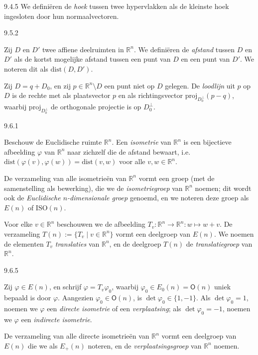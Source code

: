 \begin{res}{9.4.5}
We defini\"eren de \textit{hoek} tussen twee hypervlakken als de kleinste hoek ingesloten door hun normaalvectoren.
\end{res}

\begin{res}{9.5.2}
\begin{myenum}
\item Zij $D$ en $D'$ twee affiene deelruimten in $\mathbb R^n$. We defini\"eren de \textit{afstand} tussen $D$ en $D'$ als de kortst mogelijke afstand tussen een punt van $D$ en een punt van $D'$. We noteren dit als $\mathrm{dist}(D,D')$.
\item Zij $D=q+D_0$, en zij $p\in\mathbb R^n\setminus D$ een punt niet op $D$ gelegen. De \textit{loodlijn} uit $p$ op $D$ is de rechte met als plaatsvector $p$ en als richtingsvector $\mathrm{proj}_{D_0^\perp}(p-q)$, waarbij $\mathrm{proj}_{D_0^\perp}$ de orthogonale projectie is op $D_0^\perp$.
\end{myenum}
\end{res}

\begin{res}{9.6.1}
\begin{myenum}
\item Beschouw de Euclidische ruimte $\mathbb R^n$. Een \textit{isometrie} van $\mathbb R^n$ is een bijectieve afbeelding $\varphi$ van $\mathbb R^n$ naar zichzelf die de afstand bewaart, i.e.\ $\mathrm{dist}(\varphi(v),\varphi(w))=\mathrm{dist}(v,w)$ voor alle $v,w\in\mathbb R^n$.
\item De verzameling van alle isometrie\"en van $\mathbb R^n$ vormt een groep (met de samenstelling als bewerking), die we de \textit{isometriegroep} van $\mathbb R^n$ noemen; dit wordt ook de \textit{Euclidische $n$-dimensionale groep} genoemd, en we noteren deze groep als $E(n)$ of $\mathrm{ISO}(n)$.
\item Voor elke $v\in\mathbb R^n$ beschouwen we de afbeelding $T_v:\mathbb R^n\to\mathbb R^n:w\mapsto w+v$. De verzameling $T(n):=\{T_v\mid v\in\mathbb R^n\}$ vormt een deelgroep van $E(n)$. We noemen de elementen $T_v$ \textit{translaties} van $\mathbb R^n$, en de deelgroep $T(n)$ de \textit{translatiegroep} van $\mathbb R^n$.
\end{myenum}
\end{res}

\begin{res}{9.6.5}
\begin{myenum}
\item Zij $\varphi\in E(n)$, en schrijf $\varphi=T_v\varphi_0$, waarbij $\varphi_0\in E_0(n)=\mathsf O(n)$ uniek bepaald is door $\varphi$. Aangezien $\varphi_0\in \mathsf O(n)$, is $\det\varphi_0\in\{1,-1\}$. Als $\det\varphi_0=1$, noemen we $\varphi$ een \textit{directe isometrie} of een \textit{verplaatsing}; als $\det\varphi_0=-1$, noemen we $\varphi$ een \textit{indirecte isometrie}.
\item De verzameling van alle directe isometrie\"en van $\mathbb R^n$ vormt een deelgroep van $E(n)$ die we als $E_+(n)$ noteren, en de \textit{verplaatsingsgroep} van $\mathbb R^n$ noemen.
\end{myenum}
\end{res}



